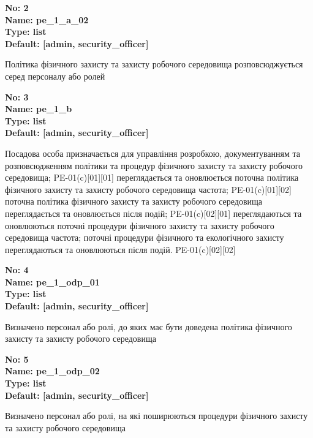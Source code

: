 \documentclass{article}
\begin{document}
{\footnotesize\bfseries
No: 2\\
Name: pe\_\allowbreak{}1\_\allowbreak{}a\_\allowbreak{}02\\
Type: list\\
Default: [\textquotedbl{}admin\textquotedbl{}, \textquotedbl{}security\_\allowbreak{}officer\textquotedbl{}]
}

{\footnotesize Політика фізичного захисту та захисту робочого середовища розповсюджується серед персоналу або ролей}


{\footnotesize\bfseries
No: 3\\
Name: pe\_\allowbreak{}1\_\allowbreak{}b\\
Type: list\\
Default: [\textquotedbl{}admin\textquotedbl{}, \textquotedbl{}security\_\allowbreak{}officer\textquotedbl{}]
}

{\footnotesize Посадова особа призначається для управління розробкою, документуванням та розповсюдженням політики та процедур фізичного захисту та захисту робочого середовища; PE-01(c)[01][01] переглядається та оновлюється поточна політика фізичного захисту та захисту робочого середовища частота; PE-01(c)[01][02] поточна політика фізичного захисту та захисту робочого середовища переглядається та оновлюється після подій; PE-01(c)[02][01] переглядаються та оновлюються поточні процедури фізичного захисту та захисту робочого середовища частота; поточні процедури фізичного та екологічного захисту переглядаються та оновлюються після подій. PE-01(c)[02][02]}


{\footnotesize\bfseries
No: 4\\
Name: pe\_\allowbreak{}1\_\allowbreak{}odp\_\allowbreak{}01\\
Type: list\\
Default: [\textquotedbl{}admin\textquotedbl{}, \textquotedbl{}security\_\allowbreak{}officer\textquotedbl{}]
}

{\footnotesize Визначено персонал або ролі, до яких має бути доведена політика фізичного захисту та захисту робочого середовища}


{\footnotesize\bfseries
No: 5\\
Name: pe\_\allowbreak{}1\_\allowbreak{}odp\_\allowbreak{}02\\
Type: list\\
Default: [\textquotedbl{}admin\textquotedbl{}, \textquotedbl{}security\_\allowbreak{}officer\textquotedbl{}]
}

{\footnotesize Визначено персонал або ролі, на які поширюються процедури фізичного захисту та захисту робочого середовища}
\end{document}
